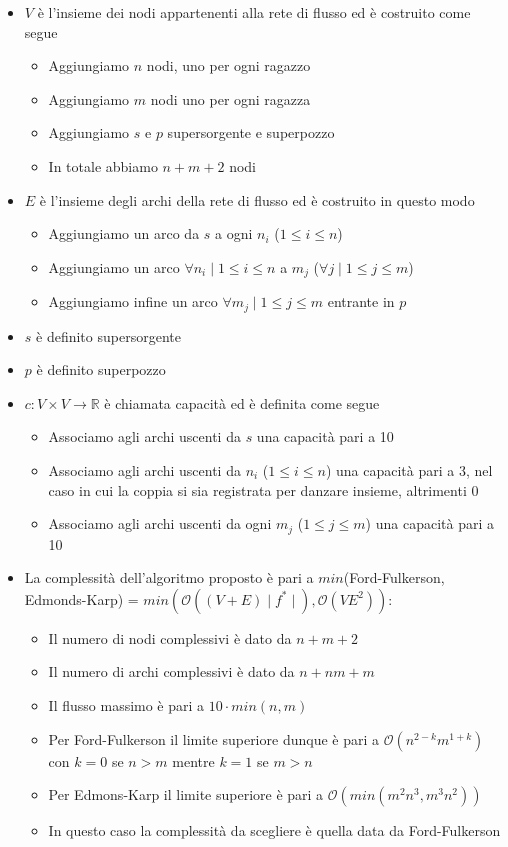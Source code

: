 \documentclass[../cheatSheetAlgoritmi.tex]{subfiles}
\begin{document}
\begin{itemize}
	\item $V$ è l'insieme dei nodi appartenenti alla rete di flusso ed è costruito come segue 
	\begin{itemize}
		\item Aggiungiamo $n$ nodi, uno per ogni ragazzo
		\item Aggiungiamo $m$ nodi uno per ogni ragazza
		\item Aggiungiamo $s$ e $p$ supersorgente e superpozzo 
		\item In totale abbiamo $n + m + 2$ nodi
	\end{itemize}
	\item $E$ è l'insieme degli archi della rete di flusso ed è costruito in questo modo
	\begin{itemize}
		\item Aggiungiamo un arco da $s$ a ogni $n_{i}$ ($1 \leq i \leq n$)
		\item Aggiungiamo un arco $\forall n_{i} \mid 1 \leq i \leq n$ a $m_{j}$ ($ \forall j \mid 1\leq j \leq m$)
		\item Aggiungiamo infine un arco $\forall m_{j} \mid 1 \leq j \leq m$ entrante in $p$
	\end{itemize}
	\item $s$ è definito supersorgente
	\item $p$ è definito superpozzo
	\item $c: V \times V \rightarrow \mathbb{R}$ è chiamata capacità ed è definita come segue
	\begin{itemize}
		\item Associamo agli archi uscenti da $s$ una capacità pari a 10
		\item Associamo agli archi uscenti da $n_{i}$ ($1 \leq i \leq n$) una capacità pari a 3, nel caso in cui la coppia si sia registrata per danzare insieme, altrimenti 0
		\item Associamo agli archi uscenti da ogni $m_{j}$ ($1 \leq j \leq m$) una capacità pari a 10
	\end{itemize}
	\item La complessità dell'algoritmo proposto è pari a $min$(Ford-Fulkerson, Edmonds-Karp) = $min(\mathcal{O}((V + E) \mid f^{*} \mid), \mathcal{O}(VE^{2}))$:
		\begin{itemize}
			\item Il numero di nodi complessivi è dato da $n + m + 2$
			\item Il numero di archi complessivi è dato da $n + nm + m$
			\item Il flusso massimo è pari a $10 \cdot min(n,m)$
			\item Per Ford-Fulkerson il limite superiore dunque è pari a $\mathcal{O}(n^{2-k} m^{1+k})$ con $k = 0$ se $n > m$ mentre $k = 1$ se $m > n$
			\item Per Edmons-Karp il limite superiore è pari a $\mathcal{O}(min(m^{2} n^{3}, m^{3} n^{2}))$
			\item In questo caso la complessità da scegliere è quella data da Ford-Fulkerson\\
		\end{itemize}
\end{itemize}
\end{document}
